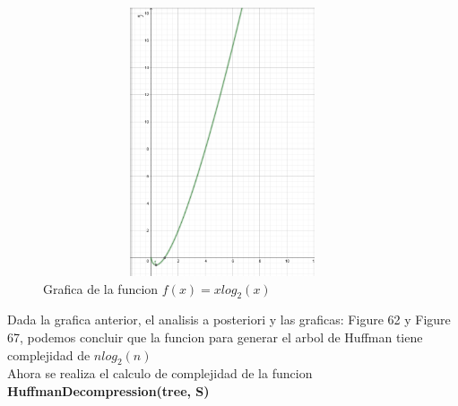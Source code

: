 \documentclass[spanish]{article}
\begin{document}
	\begin{figure}[H]
		\centering
		\includegraphics[width=400px,height=300px]{grafica11}
		\caption{Grafica de la funcion $f(x) = xlog_2(x)$  }
	\end{figure}
	Dada la grafica anterior, el analisis a posteriori y las graficas: Figure 62 y Figure 67, podemos concluir que la funcion para generar el arbol de Huffman tiene complejidad de $nlog_2(n)$\\
	Ahora se realiza el calculo de complejidad de la funcion \textbf{HuffmanDecompression(tree, S)}
\end{document}
